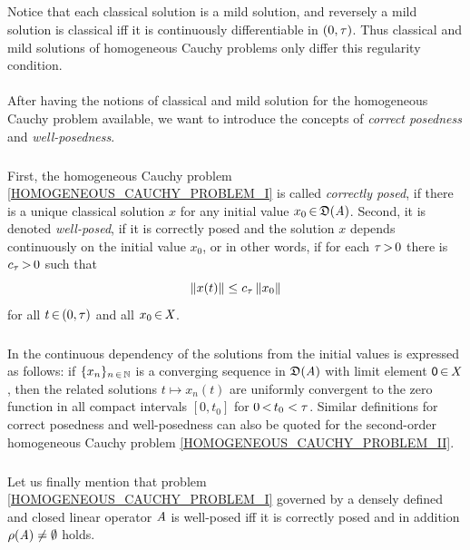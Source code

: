 \documentclass[11pt,twoside]{article}
\begin{document}
\subparagraph{} %
Notice that each classical solution is a mild solution,
and reversely a mild solution is classical
iff it is continuously differentiable in $(0,\tau)$.
Thus classical and mild solutions of homogeneous Cauchy problems
only differ {\wrt} this regularity condition.

\paragraph{} %
After having the notions of classical and mild solution for the homogeneous
Cauchy problem available,
we want to introduce the concepts of \textit{correct posedness} and
\textit{well-posedness}.

\subparagraph{} %
First,
the homogeneous Cauchy problem \eqref{HOMOGENEOUS_CAUCHY_PROBLEM_I}
is called \textit{correctly posed},
if there is a unique classical solution $x$
for any initial value $x_0 {\,\in\,} \mathfrak{D}(\mathit{A})$.
Second,
it is denoted \textit{well-posed},
if it is correctly posed and
the solution $x$ depends continuously on the initial value $x_0$,
or in other words,
if for each $\tau {\,>\,} 0$ there is $c_{\tau} {\,>\,} 0$ such that
\[
\left\lVert x(t) \right\rVert \leq c_{\tau} \left\lVert x_0 \right\rVert
\]
for all $t {\,\in\,} (0,\tau)$ and all $x_0 {\,\in\,} \mathit{X}$.

\subparagraph{}
In \cite{EN}
the continuous dependency of the solutions from the initial values
is expressed as follows:
if $\{x_n\}_{n {\,\in\,} {\mathbb{N}}}$ is a converging sequence in $\mathfrak{D}(\mathit{A})$
with limit element ${\mathsf{0}} {\,\in\,} \mathit{X}$,
then the related solutions $t \mapsto x_n(t)$ are uniformly convergent
to the zero function in all compact intervals $[0,t_0]$
for $0 {\,<\,} t_0 < \tau$.
Similar definitions for correct posedness and well-posedness can also be
quoted for the second-order homogeneous Cauchy problem
\eqref{HOMOGENEOUS_CAUCHY_PROBLEM_II}.

\subparagraph{}
Let us finally mention that problem \eqref{HOMOGENEOUS_CAUCHY_PROBLEM_I}
governed by a densely defined and closed linear operator $\mathit{A}$ is well-posed
iff
it is correctly posed and
in addition $\rho(\mathit{A}) \ne \emptyset$ holds.
\end{document}
